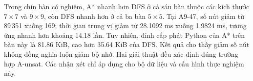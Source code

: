 Trong chín bàn có nghiệm, A* nhanh hơn DFS ở cả sáu bàn thuộc
các kích thước $7\times7$ và $9\times9$, còn DFS nhanh hơn ở cả
ba bàn $5\times5$. Tại A9-47, số nút giảm từ 89\,351 xuống 169;
thời gian trung vị giảm từ 28.1092 ms xuống 1.9824 ms, tương ứng
nhanh hơn khoảng 14.18 lần. Tuy nhiên, đỉnh cấp phát Python của
A* trên bàn này là 81.86 KiB, cao hơn 35.64 KiB của DFS.
Kết quả cho thấy giảm số nút không đồng nghĩa luôn giảm bộ nhớ.
Hai giải thuật đều xác định đúng trường hợp A-unsat. Các nhận
xét chỉ áp dụng cho bộ dữ liệu và cấu hình thực nghiệm này.
